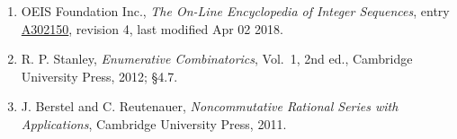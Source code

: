 \documentclass[11pt]{article}
\theoremstyle{definition}
\begin{document}
\begin{enumerate}

\item OEIS Foundation Inc., \emph{The On-Line Encyclopedia of Integer Sequences}, entry \href{https://oeis.org/A302150}{A302150}, revision 4, last modified Apr 02 2018.

\item R. P. Stanley, \emph{Enumerative Combinatorics}, Vol.~1, 2nd ed., Cambridge University Press, 2012; \S4.7.

\item J. Berstel and C. Reutenauer, \emph{Noncommutative Rational Series with Applications}, Cambridge University Press, 2011.

\end{enumerate}
\end{document}

